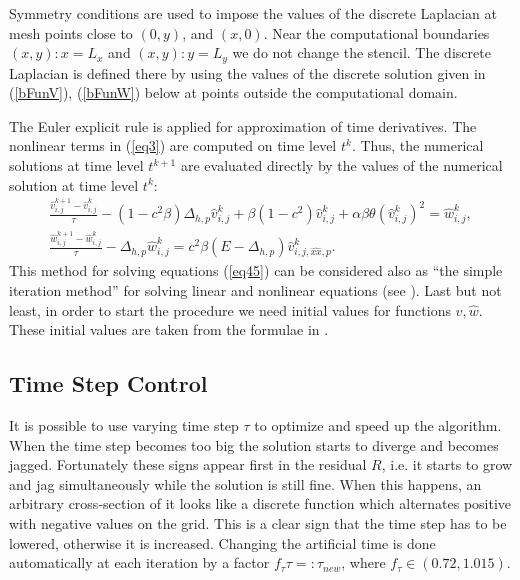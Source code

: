 \documentclass[preprint]{elsarticle}
\newcommand{\rf}[1]{(\ref{#1})}
\begin{document}
Symmetry conditions are used to impose the values of the discrete Laplacian at mesh points close to ${(0,y)}$, and $(x,0)$. 
Near  the computational boundaries $(x,y):x=L_x$ and $(x,y):y=L_y$ we do not change the stencil. The discrete Laplacian
is defined  there by using the values of the discrete solution given in \rf{bFunV}, \rf{bFunW} below at  points outside the computational domain.

\par
The Euler explicit rule is applied for approximation of  time derivatives. The nonlinear terms in \rf{eq3} are computed on    time level $t^k$. Thus, the numerical solutions at time level $t^{k+1}$ are evaluated directly by the values of the numerical solution at time level $t^k$:  
 \begin{equation}\label{eq55}
 \begin{split}
   \frac {\widehat{v}_{i,j}^{k+1}-\widehat{v}_{i,j}^{k}}{\tau}- (1-c^2 \beta) \Delta_{h,p} \widehat{v} _{i,j}^{k}+ \beta (1-c^2     ) \widehat{v}_{i,j}^{k} + \alpha \beta \theta (\widehat{v}_{i,j}^{k})^2 = \widehat{w}_{i,j}^{k}, \\
  \frac  {\widehat{w}_{i,j}^{k+1} -\widehat{w}_{i,j}^{k}} {\tau} - \Delta_{h,p} \widehat{w}_{i,j}^{k} =  c^2 \beta (E- \Delta_{h,p})       
    \widehat{v}_{i,j,{\widehat{xx},p}}^{k}. \;\;\;\; \;\;\;\;\;\;\;\;\;\;\;\;
\end{split}
\end{equation}
This method for solving equations 
\rf{eq45} can be considered also as ``the simple iteration method'' for solving linear and nonlinear equations (see \cite{sam}).
Last but not least, in order to start the procedure we need initial values for functions $\widehat{v},\widehat{w}$. These initial values are taken from the formulae in \cite{Ch2011}.

\subsection{Time Step Control}
It is possible to use varying time step $\tau$ to optimize and speed up the algorithm. When the time step becomes too big the solution starts to diverge and becomes jagged. Fortunately these signs appear first in the residual $R$,  i.e. it starts to grow and jag simultaneously while the solution is still fine. 
When this happens, an arbitrary cross-section of it looks like a discrete function which alternates positive with negative values on the grid.
This is a clear sign that the time step has to be lowered, otherwise it is increased. Changing the artificial time is done automatically at each iteration by a factor $f_{\tau}\tau =: \tau_{new}$, where $f_{\tau} \in (0.72, 1.015)$. 
\end{document}
